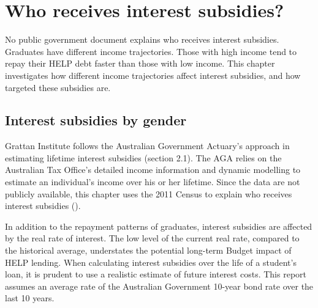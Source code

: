\documentclass[embargoed]{grattan}
\begin{document}
\chapter{Who receives interest subsidies?}\label{chap:who-receives-interest-subsidies}

No public government document explains who receives interest subsidies.
Graduates have different income trajectories.
Those with high income tend to repay their HELP debt faster than those with low income.
This chapter investigates how different income trajectories affect interest subsidies, and how targeted these subsidies are.

\section{Interest subsidies by gender}\label{sec:interest-subsidies-by-gender}

Grattan Institute follows the Australian Government Actuary's approach in estimating lifetime interest subsidies (section 2.1).
The \gls{AGA} relies on the Australian Tax Office's detailed income information and dynamic modelling to estimate an individual's income over his or her lifetime.
Since the data are not publicly available, this chapter uses the 2011 Census to explain who receives interest subsidies ().

In addition to the repayment patterns of graduates, interest subsidies are affected by the real rate of interest.
The low level of the current real rate, compared to the historical average, understates the potential long-term Budget impact of HELP lending.
When calculating interest subsidies over the life of a student's loan, it is prudent to use a realistic estimate of future interest costs.
This report assumes an average rate of the Australian Government 10-year bond rate over the last 10 years.
\end{document}
